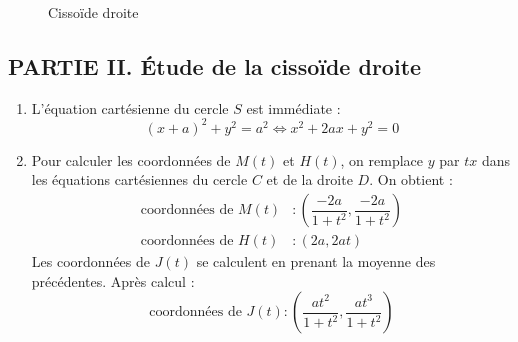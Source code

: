 \begin{figure}[ht]
 \centering
 
 \caption{Cisso{\"i}de droite}
 \label{fig:Ccubcirc_2} 
\end{figure}
\subsection*{PARTIE II. \'Etude de la cisso{\"i}de droite}
\begin{enumerate}
\item L'équation cartésienne du cercle $S$ est immédiate :
\begin{displaymath}
 (x+a)^2+y^2=a^2 \Leftrightarrow x^2 +2ax +y^2 =0
\end{displaymath}

\item Pour calculer les coordonnées de $M(t)$ et $H(t)$, on remplace $y$ par $tx$ dans les équations cartésiennes du cercle $C$ et de la droite $D$. On obtient :
\begin{align*}
 \text{coordonnées de $M(t)$} &: (\dfrac{-2a}{1+t^2},\dfrac{-2a}{1+t^2}) \\
\text{coordonnées de $H(t)$} &: (2a,2at) 
\end{align*}
Les coordonnées de $J(t)$ se calculent en prenant la moyenne des précédentes. Après calcul :
\begin{displaymath}
 \text{coordonnées de $J(t)$} : (\dfrac{at^2}{1+t^2},\dfrac{at^3}{1+t^2})
\end{displaymath}


\end{enumerate}
